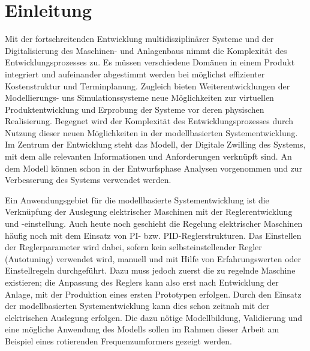 \chapter{Einleitung}
\label{chap:Einleitung}
Mit der fortschreitenden Entwicklung multidisziplinärer Systeme und der Digitalisierung des Maschinen- und Anlagenbaus nimmt die Komplexität des Entwicklungsprozesses zu. Es müssen verschiedene Domänen in einem Produkt integriert und aufeinander abgestimmt werden bei möglichst effizienter Kostenstruktur und Terminplanung. Zugleich bieten Weiterentwicklungen der Modellierungs- uns Simulationssysteme neue Möglichkeiten zur virtuellen Produktentwicklung und Erprobung der Systeme vor deren physischen Realisierung. Begegnet wird der Komplexität des Entwicklungsprozesses durch Nutzung dieser neuen Möglichkeiten in der modellbasierten Systementwicklung. Im Zentrum der Entwicklung steht das Modell, der Digitale Zwilling des Systems, mit dem alle relevanten Informationen und Anforderungen verknüpft sind. An dem Modell können schon in der Entwurfsphase Analysen vorgenommen und zur Verbesserung des Systems verwendet werden. 

Ein Anwendungsgebiet für die modellbasierte Systementwicklung ist die Verknüpfung der Auslegung elektrischer Maschinen mit der Reglerentwicklung und -einstellung. Auch heute noch geschieht die Regelung elektrischer Maschinen häufig noch mit dem Einsatz von PI- bzw. PID-Reglerstrukturen. Das Einstellen der Reglerparameter wird dabei, sofern kein selbsteinstellender Regler
(Autotuning) verwendet wird, manuell und mit Hilfe von Erfahrungswerten oder Einstellregeln durchgeführt. Dazu muss jedoch zuerst die zu regelnde Maschine existieren; die Anpassung des Reglers kann also erst nach Entwicklung der Anlage, mit der Produktion eines ersten Prototypen erfolgen. Durch den Einsatz der modellbasierten Systementwicklung kann dies schon zeitnah mit der elektrischen Auslegung erfolgen. Die dazu nötige Modellbildung, Validierung und eine mögliche Anwendung des Modells sollen im Rahmen dieser Arbeit am Beispiel eines rotierenden Frequenzumformers gezeigt werden.

